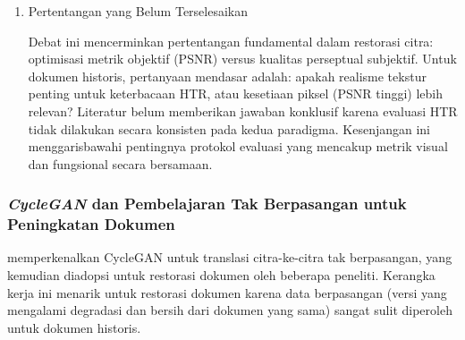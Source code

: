 \begin{enumerate}[leftmargin=*, labelindent=0pt, itemsep=1ex, topsep=0pt]
Perbandingan kualitatif dalam literatur menunjukkan kompromi: DocEnTr menghasilkan citra dengan PSNR tinggi namun cenderung \textit{over-smoothed} (hilangnya tekstur kertas), sementara DE-GAN dengan PSNR lebih rendah mempertahankan tekstur natural namun dapat menghasilkan artefak adversarial. Text-DIAE mencoba posisi tengah dengan \textit{degradation-invariant learning}, namun tanpa komponen adversarial juga menghasilkan tekstur kurang realistis dibanding GAN.

\item Pertentangan yang Belum Terselesaikan

Debat ini mencerminkan pertentangan fundamental dalam restorasi citra: optimisasi metrik objektif (PSNR) versus kualitas perseptual subjektif. Untuk dokumen historis, pertanyaan mendasar adalah: apakah realisme tekstur penting untuk keterbacaan HTR, atau kesetiaan piksel (PSNR tinggi) lebih relevan? Literatur belum memberikan jawaban konklusif karena evaluasi HTR tidak dilakukan secara konsisten pada kedua paradigma. Kesenjangan ini menggarisbawahi pentingnya protokol evaluasi yang mencakup metrik visual dan fungsional secara bersamaan.

\end{enumerate}

\subsubsection{\textit{CycleGAN} dan Pembelajaran Tak Berpasangan untuk Peningkatan Dokumen}
\label{subsubsec:cyclegan-unpaired}

\textcite{zhu2017} memperkenalkan CycleGAN untuk translasi citra-ke-citra tak berpasangan, yang kemudian diadopsi untuk restorasi dokumen oleh beberapa peneliti. Kerangka kerja ini menarik untuk restorasi dokumen karena data berpasangan (versi yang mengalami degradasi dan bersih dari dokumen yang sama) sangat sulit diperoleh untuk dokumen historis.


